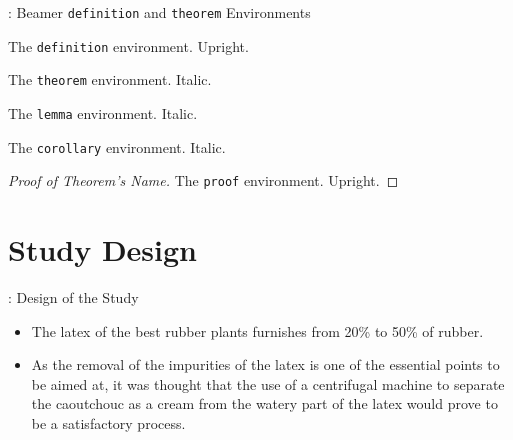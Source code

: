 \begin{frame}{\titleprefix: Beamer \texttt{definition} and \texttt{theorem} Environments}

	\begin{definition}
		The \texttt{definition} environment. Upright.
	\end{definition}

	\begin{theorem}
		The \texttt{theorem} environment. Italic.
	\end{theorem}%

	\begin{lemma}
		The \texttt{lemma} environment. Italic.
	\end{lemma}%

	\begin{corollary}
		The \texttt{corollary} environment. Italic.
	\end{corollary}%

	\begin{proof}[Proof of Theorem's Name]
		The \texttt{proof} environment. Upright.
	\end{proof}

\end{frame}


\section{Study Design}


\begin{frame}{\titleprefix: Design of the Study}

	\begin{itemize}
		\item The latex of the best rubber plants furnishes from 20\% to 50\% of rubber.
		\item As the removal of the impurities of the latex is one of the essential points to be aimed at, it was thought that the use of a centrifugal machine to separate the caoutchouc as a cream from the watery part of the latex would prove to be a satisfactory process.
	\end{itemize}

\end{frame}


